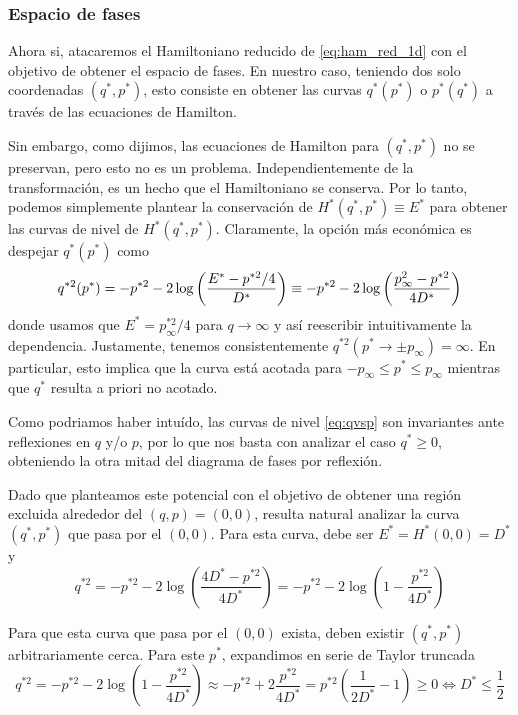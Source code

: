 \subsubsection{Espacio de fases}{\label{sec:teo_fases}}

Ahora si, atacaremos el Hamiltoniano reducido de \eqref{eq:ham_red_1d} con el objetivo de obtener el espacio de fases.
En nuestro caso, teniendo dos solo coordenadas $(q^*,p^*)$, esto consiste en obtener las curvas $q^*(p^*)$ o $p^*(q^*)$ a través de las ecuaciones de Hamilton.

Sin embargo, como dijimos, las ecuaciones de Hamilton para $(q^*,p^*)$ no se preservan, pero esto no es un problema.
Independientemente de la transformación, es un hecho que el Hamiltoniano se conserva.
Por lo tanto, podemos simplemente plantear la conservación de $H^*(q^*,p^*)\equiv E^*$ para obtener las curvas de nivel de $H^*(q^*,p^*)$.
Claramente, la opción más económica es despejar $q^*(p^*)$ como
\begin{equation}{\label{eq:qvsp}}
q^{*2}(p^*) = -p^{*2} - 2 \log\left( \frac{E^*-p^{*2}/4}{D^*} \right) \equiv -p^{*2} - 2 \log\left( \frac{p_\infty^2-p^{*2}}{4D^*} \right)
\end{equation}
donde usamos que $E^* = p_\infty^{*2}/4$ para $q\to\infty$ y así reescribir intuitivamente la dependencia.
Justamente, tenemos consistentemente $q^{*2}(p^*\to\pm p_\infty) = \infty$. 
En particular, esto implica que la curva está acotada para $-p_\infty \leq p^* \leq p_\infty$ mientras que $q^*$ resulta a priori no acotado.

Como podriamos haber intuído, las curvas de nivel \eqref{eq:qvsp} son invariantes ante reflexiones en $q$ y/o $p$, por lo que nos basta con analizar el caso $q^*\geq 0$, obteniendo la otra mitad del diagrama de fases por reflexión. 

Dado que planteamos este potencial con el objetivo de obtener una región excluida alrededor del $(q,p)=(0,0)$, resulta natural analizar la curva $(q^*,p^*)$ que pasa por el $(0,0)$.
Para esta curva, debe ser $E^* = H^*(0,0) = D^*$ y 
\[ q^{*2} = -p^{*2} - 2\log\left( \frac{4D^*-p^{*2}}{4D^*} \right) 
= -p^{*2} - 2\log\left( 1-\frac{p^{*2}}{4D^*} \right) \]

Para que esta curva que pasa por el $(0,0)$ exista, deben existir $(q^*, p^*)$ arbitrariamente cerca.
Para este $p^*$, expandimos en serie de Taylor truncada
\[ q^{*2} = -p^{*2} - 2\log\left( 1-\frac{p^{*2}}{4D^*} \right) \approx -p^{*2} + 2\frac{p^{*2}}{4D^*}  = p^{*2} \left( \frac{1}{2D^*} -1 \right) \geq 0 \Longleftrightarrow D^* \leq \frac{1}{2} \]

